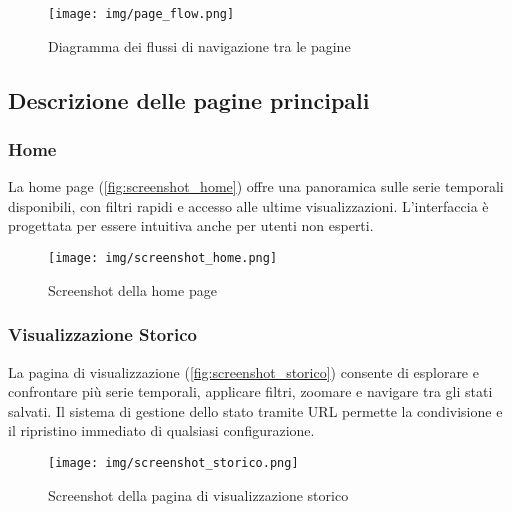 \vspace{0.5cm}
\begin{figure}[h!]
    \centering
    \texttt{[image: img/page\_flow.png]}
    \caption{Diagramma dei flussi di navigazione tra le pagine}
    \label{fig:page_flow}
\end{figure}
\vspace{0.5cm}

\subsection{Descrizione delle pagine principali}

\subsubsection{Home}

La home page (\autoref{fig:screenshot_home}) offre una panoramica sulle serie temporali disponibili, con filtri rapidi e accesso alle ultime visualizzazioni. L’interfaccia è progettata per essere intuitiva anche per utenti non esperti.

\vspace{0.5cm}
\begin{figure}[h!]
    \centering
    \texttt{[image: img/screenshot\_home.png]}
    \caption{Screenshot della home page}
    \label{fig:screenshot_home}
\end{figure}
\vspace{0.5cm}

\subsubsection{Visualizzazione Storico}

La pagina di visualizzazione (\autoref{fig:screenshot_storico}) consente di esplorare e confrontare più serie temporali, applicare filtri, zoomare e navigare tra gli stati salvati. Il sistema di gestione dello stato tramite URL permette la condivisione e il ripristino immediato di qualsiasi configurazione.

\vspace{0.5cm}
\begin{figure}[h!]
    \centering
    \texttt{[image: img/screenshot\_storico.png]}
    \caption{Screenshot della pagina di visualizzazione storico}
    \label{fig:screenshot_storico}
\end{figure}
\vspace{0.5cm}

